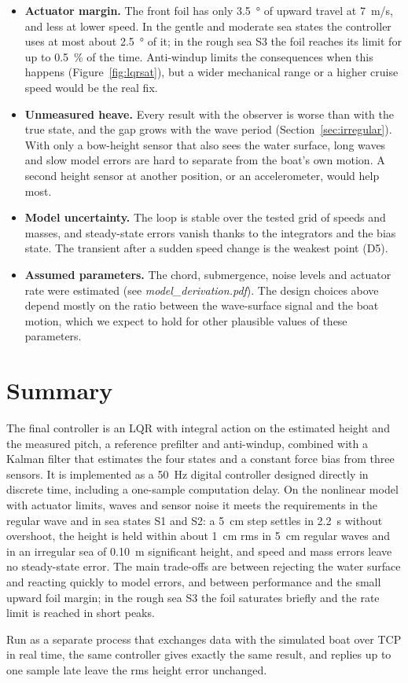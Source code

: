 \documentclass[11pt,a4paper]{article}
\begin{document}
\begin{itemize}
\item \textbf{Actuator margin.} The front foil has only \SI{3.5}{\degree} of
      upward travel at \SI{7}{m/s}, and less at lower speed. In the gentle and
      moderate sea states the controller uses at most about \SI{2.5}{\degree} of
      it; in the rough sea S3 the foil reaches its limit for up to
      \SI{0.5}{\percent} of the time. Anti-windup limits the consequences when
      this happens (Figure~\ref{fig:lqrsat}), but a wider
      mechanical range or a higher cruise speed would be the real fix.
\item \textbf{Unmeasured heave.} Every result with the observer is worse than
      with the true state, and the gap grows with the wave period
      (Section~\ref{sec:irregular}). With only a bow-height sensor that also sees
      the water surface, long waves and slow model errors are hard to separate
      from the boat's own motion. A second height sensor at another position,
      or an accelerometer, would help most.
\item \textbf{Model uncertainty.} The loop is stable over the tested grid of
      speeds and masses, and steady-state errors vanish thanks to the integrators
      and the bias state. The transient after a sudden speed change is the
      weakest point (D5).
\item \textbf{Assumed parameters.} The chord, submergence, noise levels and
      actuator rate were estimated (see \emph{model\_derivation.pdf}). The design
      choices above depend mostly on the ratio between the wave-surface signal
      and the boat motion, which we expect to hold for other plausible values
      of these parameters.
\end{itemize}

\section{Summary}

The final controller is an LQR with integral action on the estimated height and
the measured pitch, a reference prefilter and anti-windup, combined with a
Kalman filter that estimates the four states and a constant force bias from
three sensors. It is implemented as a \SI{50}{Hz} digital controller designed
directly in discrete time, including a one-sample computation delay. On the
nonlinear model with actuator limits, waves and sensor noise it meets the
requirements in the regular wave and in sea states S1 and S2: a \SI{5}{cm} step
settles in \SI{2.2}{s} without overshoot,
the height is held within about \SI{1}{cm} rms in \SI{5}{cm} regular waves and in
an irregular sea of \SI{0.10}{m} significant height, and speed and mass errors
leave no steady-state error. The main trade-offs are between rejecting the water
surface and reacting quickly to model errors, and between performance and the
small upward foil margin; in the rough sea S3 the foil saturates briefly and the
rate limit is reached in short peaks.

Run as a separate process that exchanges data with the simulated boat over TCP
in real time, the same controller gives exactly the same result, and replies up
to one sample late leave the rms height error unchanged.
\end{document}
